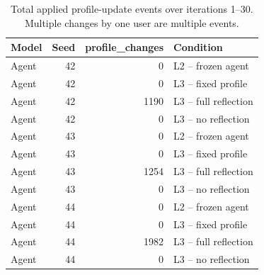\begin{table}[htbp!]
\centering
\small
\setlength{\tabcolsep}{3pt}
\renewcommand{\arraystretch}{1.1}
\begin{tabular}{lrrl}
\hline
Model & Seed & profile\_changes & Condition \\
\hline
Agent & 42 & 0 & L2 -- frozen agent \\
Agent & 42 & 0 & L3 -- fixed profile \\
Agent & 42 & 1190 & L3 -- full reflection \\
Agent & 42 & 0 & L3 -- no reflection \\
Agent & 43 & 0 & L2 -- frozen agent \\
Agent & 43 & 0 & L3 -- fixed profile \\
Agent & 43 & 1254 & L3 -- full reflection \\
Agent & 43 & 0 & L3 -- no reflection \\
Agent & 44 & 0 & L2 -- frozen agent \\
Agent & 44 & 0 & L3 -- fixed profile \\
Agent & 44 & 1982 & L3 -- full reflection \\
Agent & 44 & 0 & L3 -- no reflection \\
\hline
\end{tabular}
\caption{Total applied profile-update events over iterations 1--30. Multiple changes by one user are multiple events.}
\label{chap:results:tab:rq3_profile_change_totals}
\end{table}
